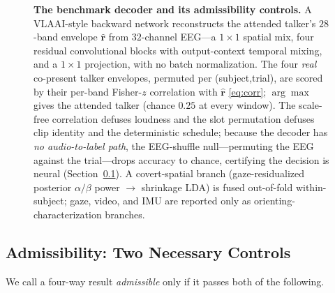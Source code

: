 \documentclass[journal]{IEEEtran}
\newcommand{\chance}{0.25}
\begin{document}
\begin{figure}[t]
\caption{\textbf{The benchmark decoder and its admissibility controls.} A VLAAI-style
backward network reconstructs the attended talker's $28$-band envelope $\hat{\mathbf r}$
from $32$-channel EEG---a $1{\times}1$ spatial mix, four residual convolutional blocks with
output-context temporal mixing, and a $1{\times}1$ projection, with no batch normalization.
The four \emph{real} co-present talker envelopes, permuted per (subject,trial), are scored by
their per-band Fisher-$z$ correlation with $\hat{\mathbf r}$ \eqref{eq:corr}; $\arg\max$ gives
the attended talker (chance $\chance$ at every window). The scale-free correlation defuses
loudness and the slot permutation defuses clip identity and the deterministic schedule; because
the decoder has \emph{no audio-to-label path}, the EEG-shuffle null---permuting the EEG against
the trial---drops accuracy to chance, certifying the decision is neural
(Section~\ref{sec:bench-admissibility}). A covert-spatial branch (gaze-residualized posterior
$\alpha/\beta$ power $\to$ shrinkage LDA) is fused out-of-fold within-subject; gaze, video, and
IMU are reported only as orienting-characterization branches.}
\label{fig:model}
\end{figure}

\subsection{Admissibility: Two Necessary Controls}
\label{sec:bench-admissibility}

We call a four-way result \emph{admissible} only if it passes both of the following.
\end{document}
